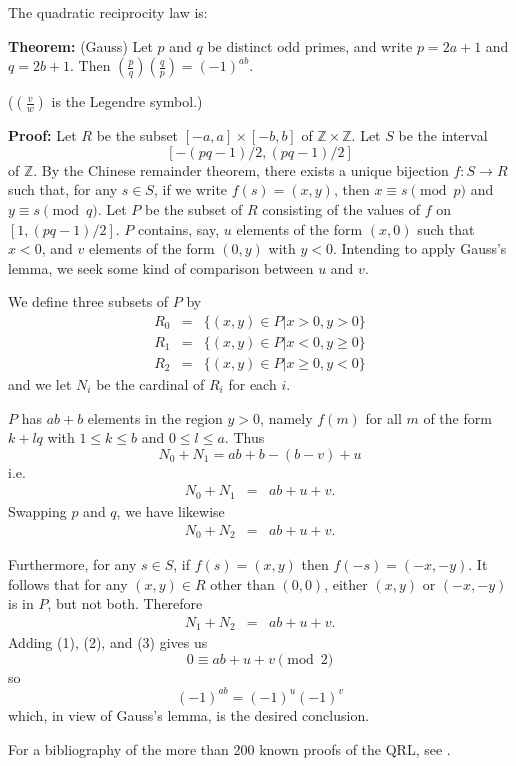 \documentclass[12pt]{article}
\begin{document}
The quadratic reciprocity law is:

\textbf{Theorem:} (Gauss) Let $p$ and $q$ be distinct odd primes,
and write $p=2a+1$ and $q=2b+1$. Then
$\left(\frac{p}{q}\right)\left(\frac{q}{p}\right)=(-1)^{ab}$.

($\left(\frac{v}{w}\right)$ is the Legendre symbol.)

\textbf{Proof:}
Let $R$ be the subset $[-a,a] \times [-b,b]$
of ${\mathbb Z} \times {\mathbb Z}$. Let $S$
be the interval $$[-(pq-1)/2, (pq-1)/2]$$ of ${\mathbb Z}$.
By the Chinese remainder theorem, there exists a unique
bijection $f: S\to R$ such that, for any $s\in S$, if we
write $f(s)=(x,y)$, then
$ x\equiv s \pmod p $ and
$ y\equiv s \pmod q$.
Let $P$ be the subset of $R$ consisting of the values of $f$ on
$[1, (pq-1)/2 ]$. 
$P$ contains, say, $u$ elements of the form
$(x,0)$ such that $x<0$, and $v$ elements of the form
$(0,y)$ with $y<0$. Intending to apply Gauss's lemma,
we seek some kind of comparison between $u$ and $v$.

We define three subsets of $P$ by
\begin{eqnarray*}
R_{0} & = & \{(x,y) \in P | x > 0, y > 0 \} \\
R_{1} & = & \{(x,y) \in P | x < 0, y \ge 0 \} \\
R_{2} & = & \{(x,y) \in P | x \ge 0, y < 0 \}
\end{eqnarray*}
and we let $N_{i}$ be the cardinal of $R_{i}$ for each $i$.

$P$ has $ab+b$ elements in the region $y>0$, namely $f(m)$ for all
$m$ of the form $k+lq$ with
$1 \le k \le b$ and $0 \le l \le a$.
Thus
$$N_{0}+N_{1} = ab + b - (b-v) + u$$
i.e.
\begin{eqnarray}
N_{0}+N_{1} & = & ab+u+v.
\end{eqnarray}
Swapping $p$ and $q$, we have likewise
\begin{eqnarray}
N_{0}+N_{2} & = & ab+u+v.
\end{eqnarray}

Furthermore, for any $s \in S$, if $f(s)=(x,y)$ then $f(-s)=(-x,-y)$.
It follows that for any $(x,y) \in R$
other than $(0,0)$, either $(x,y)$ or $(-x,-y)$ is
in $P$, but not both.
Therefore
\begin{eqnarray}
N_{1}+N_{2} & = & ab+u+v.
\end{eqnarray}
Adding (1), (2), and (3) gives us
$$0 \equiv ab + u + v \pmod 2$$ so $$(-1)^{ab}=(-1)^{u}(-1)^{v}$$
which, in view of Gauss's lemma, is the desired conclusion.

For a bibliography of the more than 200 known proofs of
the QRL, see
.
\end{document}
